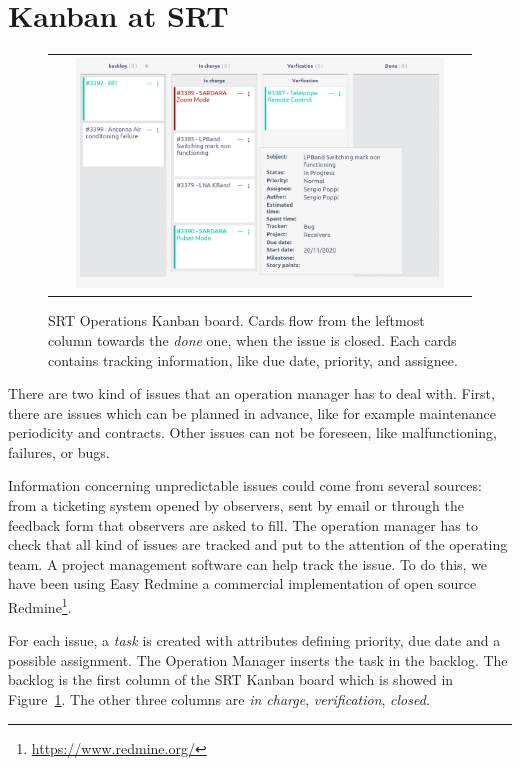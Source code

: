 \documentclass[a4paper]{spie}  %
\begin{document}
\section{Kanban at SRT}



\begin{figure} [!ht]
   \begin{center}
   \begin{tabular}{c} 
   \includegraphics[width=0.9\textwidth]{kanbanboard.png}
	\end{tabular}
	\end{center}
   \caption[example] 
   { \label{fig:kanbansrt} SRT Operations Kanban  board. Cards flow from the leftmost column towards the \textit{done} one, when the issue is closed. Each cards contains tracking information, like due date, priority, and assignee.}

   \end{figure} 

There are two kind of issues that an operation manager has to deal with. First, there are issues which can be planned  in advance, like for example  maintenance periodicity and contracts. 
Other issues can not be foreseen, like malfunctioning, failures, or bugs.

Information concerning unpredictable issues could come from several sources: from a ticketing system opened by observers, sent by email or through the feedback form that observers are asked to fill.
The operation manager has to check that all kind of issues are tracked and put to the attention of the operating team. 
A project management software can help track the issue. To do this, we have been using Easy Redmine a commercial implementation of open source Redmine\footnote{\url{https://www.redmine.org/}}.  

For each issue,  a \textit{task} is created with attributes defining  priority, due date and a possible assignment.
The Operation Manager inserts the task in the backlog. The backlog is the first column of the SRT  Kanban board which is  showed in Figure~\ref{fig:kanbansrt}. The other three columns are  \textit{in charge}, \textit{verification}, \textit{closed}.
\end{document}
